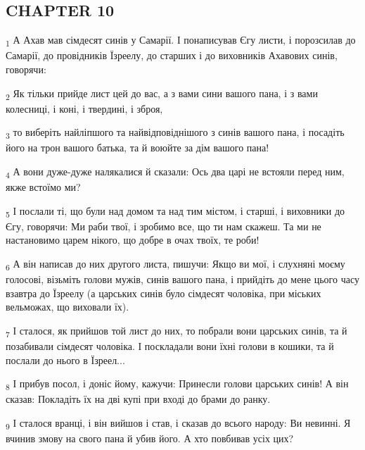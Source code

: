 \subsection{CHAPTER 10}
\begin{tcolorbox}
\textsubscript{1} А Ахав мав сімдесят синів у Самарії. І понаписував Єгу листи, і порозсилав до Самарії, до провідників Їзреелу, до старших і до виховників Ахавових синів, говорячи:
\end{tcolorbox}
\begin{tcolorbox}
\textsubscript{2} Як тільки прийде лист цей до вас, а з вами сини вашого пана, і з вами колесниці, і коні, і твердині, і зброя,
\end{tcolorbox}
\begin{tcolorbox}
\textsubscript{3} то виберіть найліпшого та найвідповіднішого з синів вашого пана, і посадіть його на трон вашого батька, та й воюйте за дім вашого пана!
\end{tcolorbox}
\begin{tcolorbox}
\textsubscript{4} А вони дуже-дуже налякалися й сказали: Ось два царі не встояли перед ним, якже встоїмо ми?
\end{tcolorbox}
\begin{tcolorbox}
\textsubscript{5} І послали ті, що були над домом та над тим містом, і старші, і виховники до Єгу, говорячи: Ми раби твої, і зробимо все, що ти нам скажеш. Та ми не настановимо царем нікого, що добре в очах твоїх, те роби!
\end{tcolorbox}
\begin{tcolorbox}
\textsubscript{6} А він написав до них другого листа, пишучи: Якщо ви мої, і слухняні моєму голосові, візьміть голови мужів, синів вашого пана, і прийдіть до мене цього часу взавтра до Їзреелу (а царських синів було сімдесят чоловіка, при міських вельможах, що виховали їх).
\end{tcolorbox}
\begin{tcolorbox}
\textsubscript{7} І сталося, як прийшов той лист до них, то побрали вони царських синів, та й позабивали сімдесят чоловіка. І поскладали вони їхні голови в кошики, та й послали до нього в Їзреел...
\end{tcolorbox}
\begin{tcolorbox}
\textsubscript{8} І прибув посол, і доніс йому, кажучи: Принесли голови царських синів! А він сказав: Покладіть їх на дві купі при вході до брами до ранку.
\end{tcolorbox}
\begin{tcolorbox}
\textsubscript{9} І сталося вранці, і він вийшов і став, і сказав до всього народу: Ви невинні. Я вчинив змову на свого пана й убив його. А хто повбивав усіх цих?
\end{tcolorbox}
